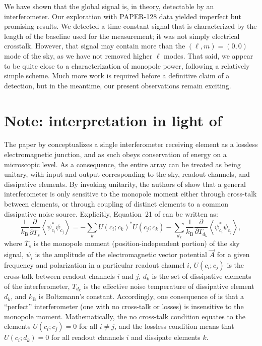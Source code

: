 We have shown that the global signal is, in theory, detectable by an interferometer. Our exploration with PAPER-128 data yielded imperfect but promising results. We detected a time-constant signal that is characterized by the length of the baseline used for the measurement; it was not simply electrical crosstalk. However, that signal may contain more than the $(\ell,m)=(0,0)$ mode of the sky, as we have not removed higher $\ell$ modes. That said, we appear to be quite close to a characterization of monopole power, following a relatively simple scheme. Much more work is required before a definitive claim of a detection, but in the meantime, our present observations remain exciting.

\section*{Note: interpretation in light of \cite{Venumadhav.16}}
The paper by \citealt{Venumadhav.16} conceptualizes a single
interferometer receiving element as a lossless electromagnetic junction, and as
such obeys conservation of energy on a microscopic level. As a consequence, the
entire array can be treated as being unitary, with input and output
corresponding to the sky, readout channels, and dissipative elements. By
invoking unitarity, the authors of \citealt{Venumadhav.16} show that a general interferometer is
only sensitive to the monopole moment either through cross-talk between
elements, or through coupling of distinct elements to a common dissipative noise
source. Explicitly, Equation~21 of \citealt{Venumadhav.16} can be written as:
\begin{equation}
\frac{1}{k_\mathrm{B}} \frac{\partial}{\partial\bar{T}_s} \left\langle\psi_{c_i}^* \psi_{c_j}\right\rangle =
- \sum_k U(c_i; c_k)^* U(c_j; c_k) - \sum_{d_k} \frac{1}{k_\mathrm{B}} \frac{\partial}{\partial T_{d_k}} \left\langle\psi_{c_i}^* \psi_{c_j}\right\rangle, 
\label{eqn:21V16}
\end{equation}
where ${\bar{T}_s}$ is the monopole moment (position-independent portion) of the
sky signal, $\psi_i$ is the amplitude of the electromagnetic vector potential
$\vec{A}$ for a given frequency and polarization in a particular readout channel
$i$, $U(c_i; c_j)$ is the cross-talk between readout channels $i$ and $j$, $d_k$
is the set of dissipative elements of the interferometer, $T_{d_k}$ is the
effective noise temperature of dissipative element $d_k$, and $k_\mathrm{B}$ is
Boltzmann's constant. Accordingly, one consequence of \citealt{Venumadhav.16} is that a ``perfect''
interferometer (one with no cross-talk or losses) is insensitive to the monopole
moment. Mathematically, the no cross-talk condition equates to the elements
$U(c_i; c_j) = 0$ for all $i \neq j$, and the lossless condition means that
$U(c_i; d_k) = 0$ for all readout channels $i$ and dissipate elements $k$.

